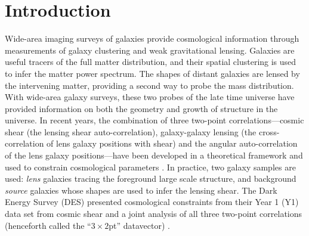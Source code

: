 \documentclass[aps, prd,twocolumn,superscriptaddress,nofootinbib,preprintnumbers]{revtex4-1}
\newcommand{\IR}[1]{{\color{red}[\textbf{Note for IR}: #1]}}
\begin{document}


\maketitle




\section{Introduction}
\label{sec:intro}

Wide-area imaging surveys of galaxies provide cosmological information through measurements of galaxy clustering and weak gravitational lensing. Galaxies are useful tracers of the full matter distribution, and their spatial clustering is used to infer the matter power spectrum. The shapes of distant galaxies are lensed by the intervening matter, providing a second way to probe the mass distribution. With wide-area galaxy surveys, these two probes of the late time universe have provided  information on both the geometry and growth of structure in the universe. 
In recent years, the combination of  three two-point correlations---cosmic shear (the lensing shear auto-correlation), galaxy-galaxy lensing (the cross-correlation of lens galaxy positions with shear) and the angular auto-correlation of the lens galaxy positions---have been developed in a theoretical framework \citep{Cacciato_2009,Baldauf_2010,Cacciato_2012,van_den_Bosch_2013, Wibking_2018} and used to constrain cosmological parameters  \citep{Cacciato_2013,Mandelbaum_2013,Kwan_2016,More_2015,Dvornik_2018,Coupon_2015, Singh_2019, Wibking_2019}. In practice, two galaxy samples are used:  {\it lens} galaxies tracing the foreground large scale structure, and background {\it source} galaxies whose shapes are used to infer the lensing shear. 
The Dark Energy Survey (DES) presented cosmological constraints from their Year 1 (Y1) data set from cosmic shear \citep{Troxel_2018} and a joint analysis of all three two-point correlations (henceforth called the ``$3\times2$pt'' datavector) \citep{Abbott_2018}. 
\end{document}
